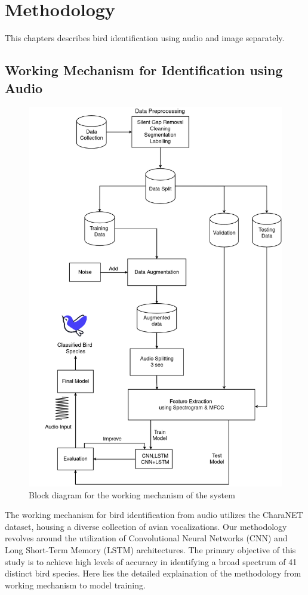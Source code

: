 \chapter{Methodology}
This chapters describes bird identification using audio and image separately.
\section{Working Mechanism for Identification using Audio}
\begin{figure}[h!]
    \centering
    \includegraphics[scale=0.33]{images/Methodology1.png}
    \caption{Block diagram for the working mechanism of the system}%
\end{figure}
\newpage
The working mechanism for bird identification from audio utilizes the CharaNET dataset, 
housing a diverse collection of avian vocalizations. Our methodology revolves around the 
utilization of Convolutional Neural Networks (CNN) and Long Short-Term Memory (LSTM) architectures. 
The primary objective of this study is to achieve high levels of accuracy in identifying a 
broad spectrum of 41 distinct bird species. Here lies the detailed explaination of the methodology 
from working mechanism to model training.
